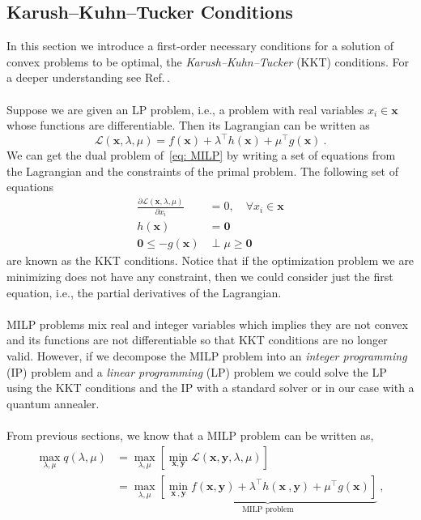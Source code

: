 \subsection{Karush–Kuhn–Tucker Conditions}
In this section we introduce a first-order necessary conditions for a solution of convex problems to be optimal, the \textit{Karush–Kuhn–Tucker} (KKT) conditions. For a deeper understanding see Ref.\,\cite{Boyd2004}.\\\\
Suppose we are given an LP problem, i.e., a problem with real variables $x_{i}\in\mathbf{x}$ whose functions are differentiable. Then its Lagrangian can be written as
\begin{equation}
    \mathcal{L}(\mathbf{x}, \lambda, \mu) = f(\mathbf{x}) + \lambda^{\intercal}h(\mathbf{x}) + \mu^{\intercal}g(\mathbf{x})\ .
\end{equation}
We can get the dual problem of \,\eqref{eq: MILP} by writing a set of equations from the Lagrangian and the constraints of the primal problem. The following set of equations 
\begin{align}
    \frac{\partial \mathcal{L}(\mathbf{x},\lambda, \mu)}{\partial x_{i}} &= 0, \quad  \forall x_{i} \in \mathbf{x} \\
    h(\mathbf{x}) &= \mathbf{0} \\
    \mathbf{0}\leq - g(\mathbf{x})&\perp \mu \geq \mathbf{0} 
\end{align}
are known as the KKT conditions. Notice that if the optimization problem we are minimizing does not have any constraint, then we could consider just the first equation, i.e., the partial derivatives of the Lagrangian.\\\\
MILP problems mix real and integer variables which implies they are not convex and its functions are not differentiable so that KKT conditions are no longer valid. However, if we decompose the MILP problem into an \textit{integer programming} (IP) problem and a \textit{linear programming} (LP) problem we could solve the LP using the KKT conditions and the IP with a standard solver or in our case with a quantum annealer.\\\\
From previous sections, we know that a MILP problem can be written as,
\begin{align}
    \max_{\lambda,\mu} q(\lambda,\mu) &=\max_{\lambda,\mu}\left[\min_{\mathbf{x},\mathbf{y}}\mathcal{L}(\mathbf{x}, \mathbf{y},\lambda,\mu)\right] \\
    &= \max_{\lambda,\mu}\underbrace{\left[\min_{\mathbf{x}\ , \mathbf{y}}f(\mathbf{x}, \mathbf{y}) + \lambda^{\intercal}h(\mathbf{x}\ , \mathbf{y}) + \mu^{\intercal}g(\mathbf{x})\right]}_{\textrm{MILP problem}} \ ,
\end{align}
